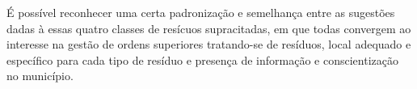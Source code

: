 É possível reconhecer uma certa padronização e semelhança entre as sugestões dadas à essas quatro classes de resícuos supracitadas, em que todas convergem ao interesse na gestão de ordens superiores tratando-se de resíduos, local adequado e específico para cada tipo de resíduo e presença de informação e conscientização no município.